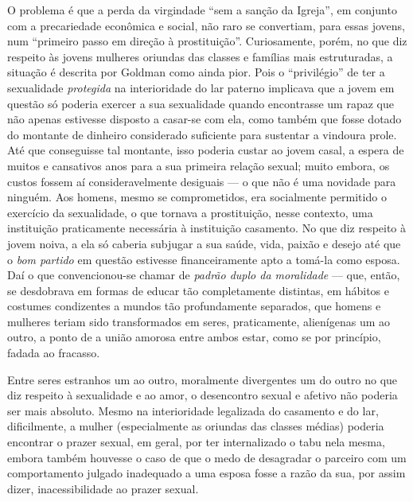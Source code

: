O problema é que a perda da virgindade ``sem a sanção da
Igreja'', em conjunto com a precariedade econômica e social, não raro se
convertiam, para essas jovens, num ``primeiro passo em direção à
prostituição''. Curiosamente, porém, no que diz respeito às jovens
mulheres oriundas das classes e famílias mais estruturadas, a situação é
descrita por Goldman como ainda pior. Pois o ``privilégio'' de ter a
sexualidade \textit{protegida} na interioridade do lar paterno implicava que
a jovem em questão só poderia exercer a sua sexualidade quando
encontrasse um rapaz que não apenas estivesse disposto a casar-se com
ela, como também que fosse dotado do montante de dinheiro considerado
suficiente para sustentar a vindoura prole. Até que conseguisse tal
montante, isso poderia custar ao jovem casal, a espera de muitos e
cansativos anos para a sua primeira relação sexual; muito embora, os
custos fossem aí consideravelmente desiguais --- o que não é uma novidade
para ninguém. Aos homens, mesmo se comprometidos, era socialmente
permitido o exercício da sexualidade, o que tornava a prostituição,
nesse contexto, uma instituição praticamente necessária à instituição
casamento. No que diz respeito à jovem noiva, a ela só caberia subjugar
a sua saúde, vida, paixão e desejo até que o \textit{bom partido} em questão
estivesse financeiramente apto a tomá-la como esposa. Daí o que
convencionou-se chamar de \textit{padrão duplo da moralidade} --- que, então,
se desdobrava em formas de educar tão completamente distintas, em
hábitos e costumes condizentes a mundos tão profundamente separados, que
homens e mulheres teriam sido transformados em seres, praticamente,
alienígenas um ao outro, a ponto de a união amorosa entre ambos estar,
como se por princípio, fadada ao fracasso.

Entre seres estranhos um ao outro, moralmente divergentes um do
outro no que diz respeito à sexualidade e ao amor, o desencontro sexual
e afetivo não poderia ser mais absoluto. Mesmo na interioridade
legalizada do casamento e do lar, dificilmente, a mulher (especialmente
as oriundas das classes médias) poderia encontrar o prazer sexual, em
geral, por ter internalizado o tabu nela mesma, embora também houvesse o
caso de que o medo de desagradar o parceiro com um comportamento julgado
inadequado a uma esposa fosse a razão da sua, por assim dizer,
inacessibilidade ao prazer sexual. 

